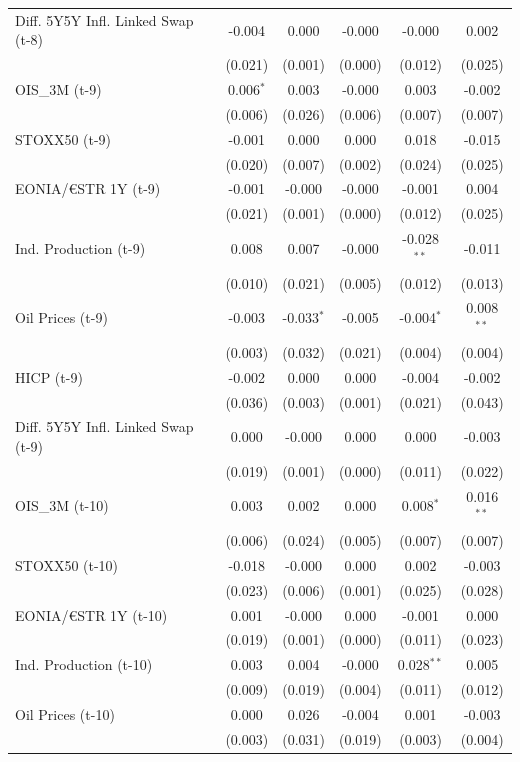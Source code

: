 \begin{longtable}[t]{lccccc}
Diff. 5Y5Y Infl. Linked Swap (t-8) & -0.004 & 0.000 & -0.000 & -0.000 & 0.002\\
 & (0.021) & (0.001) & (0.000) & (0.012) & \vphantom{1} (0.025)\\
OIS\_3M (t-9) & 0.006$^{*}$ & 0.003 & -0.000 & 0.003 & -0.002\\
 & (0.006) & (0.026) & (0.006) & (0.007) & (0.007)\\
STOXX50 (t-9) & -0.001 & 0.000 & 0.000 & 0.018 & -0.015\\
 & (0.020) & (0.007) & (0.002) & (0.024) & (0.025)\\
EONIA/€STR 1Y (t-9) & -0.001 & -0.000 & -0.000 & -0.001 & 0.004\\
 & (0.021) & (0.001) & (0.000) & (0.012) & (0.025)\\
Ind. Production (t-9) & 0.008 & 0.007 & -0.000 & -0.028$^{**}$ & -0.011\\
 & (0.010) & (0.021) & (0.005) & (0.012) & (0.013)\\
Oil Prices (t-9) & -0.003 & -0.033$^{*}$ & -0.005 & -0.004$^{*}$ & 0.008$^{**}$\\
 & (0.003) & (0.032) & (0.021) & (0.004) & (0.004)\\
HICP (t-9) & -0.002 & 0.000 & 0.000 & -0.004 & -0.002\\
 & (0.036) & (0.003) & (0.001) & (0.021) & (0.043)\\
Diff. 5Y5Y Infl. Linked Swap (t-9) & 0.000 & -0.000 & 0.000 & 0.000 & -0.003\\
 & (0.019) & (0.001) & (0.000) & (0.011) & (0.022)\\
OIS\_3M (t-10) & 0.003 & 0.002 & 0.000 & 0.008$^{*}$ & 0.016$^{**}$\\
 & (0.006) & (0.024) & (0.005) & (0.007) & (0.007)\\
STOXX50 (t-10) & -0.018 & -0.000 & 0.000 & 0.002 & -0.003\\
 & (0.023) & (0.006) & (0.001) & (0.025) & (0.028)\\
EONIA/€STR 1Y (t-10) & 0.001 & -0.000 & 0.000 & -0.001 & 0.000\\
 & (0.019) & (0.001) & (0.000) & (0.011) & (0.023)\\
Ind. Production (t-10) & 0.003 & 0.004 & -0.000 & 0.028$^{**}$ & 0.005\\
 & (0.009) & (0.019) & (0.004) & (0.011) & (0.012)\\
Oil Prices (t-10) & 0.000 & 0.026 & -0.004 & 0.001 & -0.003\\
 & (0.003) & (0.031) & (0.019) & (0.003) & (0.004)\\

\end{longtable}
